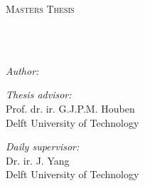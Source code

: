 \documentclass[
11pt, %
english, %
singlespacing, %
headsepline, %
]{MastersDoctoralThesis} %
\author{Philippe Lammerts} %
\begin{document}
\frontmatter %

\pagestyle{plain} %


\begin{titlepage}
    \begin{center}

        \vspace*{.06\textheight}
        {\scshape\LARGE \univname\par}\vspace{1.5cm} %
        \textsc{\Large Masters Thesis}\\[0.5cm] %

        \HRule \\[0.4cm] %
        {\huge \bfseries \ttitle\par}\vspace{0.4cm} %
        \HRule \\[1.5cm] %

        \begin{minipage}[t]{0.4\textwidth}
            \begin{flushleft} \large
                \emph{Author:}\\
                \authorname %
            \end{flushleft}
        \end{minipage}
        \begin{minipage}[t]{0.5\textwidth}
            \begin{flushright} \large
                \emph{Thesis advisor:}\\
                Prof. dr. ir. G.J.P.M. Houben\\
                Delft University of Technology
            \end{flushright}

            \begin{flushright} \large
                \emph{Daily supervisor:} \\
                Dr. ir. J. Yang\\
                Delft University of Technology
            \end{flushright}


\end{minipage}
\end{center}
\end{titlepage}
\end{document}
